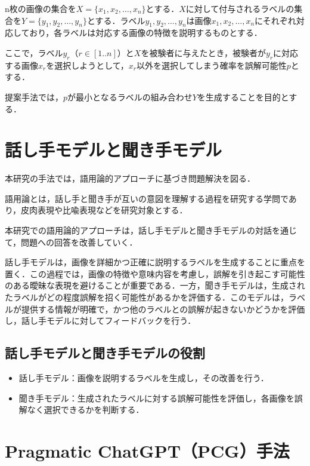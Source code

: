 \documentclass[a4paper,11pt]{jreport}
\begin{document}
n枚の画像の集合を\(X = \{x_1, x_2, \ldots, x_n\}\)とする．\(X\)に対して付与されるラベルの集合を\(Y = \{y_1, y_2, \ldots, y_n\}\)とする．ラベル\(y_1, y_2, \ldots, y_n\)は画像\(x_1, x_2, \ldots, x_n\)にそれぞれ対応しており，各ラベルは対応する画像の特徴を説明するものとする．

ここで，ラベル\(y_r\)（$r \in [1..n]$）と\(X\)を被験者に与えたとき，被験者が\(y_r\)に対応する画像\(x_r\)を選択しようとして，\(x_r\)以外を選択してしまう確率を誤解可能性\(p\)とする．

提案手法では，\(p\)が最小となるラベルの組み合わせ\(Y\)を生成することを目的とする．


\section{話し手モデルと聞き手モデル}

本研究の手法では，語用論的アプローチに基づき問題解決を図る．

語用論とは，話し手と聞き手が互いの意図を理解する過程を研究する学問であり，皮肉表現や比喩表現などを研究対象とする．

本研究での語用論的アプローチは，話し手モデルと聞き手モデルの対話を通じて，問題への回答を改善していく．

話し手モデルは，画像を詳細かつ正確に説明するラベルを生成することに重点を置く．この過程では，画像の特徴や意味内容を考慮し，誤解を引き起こす可能性のある曖昧な表現を避けることが重要である．一方，聞き手モデルは，生成されたラベルがどの程度誤解を招く可能性があるかを評価する．このモデルは，ラベルが提供する情報が明確で，かつ他のラベルとの誤解が起きないかどうかを評価し，話し手モデルに対してフィードバックを行う．
\subsection{話し手モデルと聞き手モデルの役割}

\begin{itemize}
  \item 話し手モデル：画像を説明するラベルを生成し，その改善を行う．
  \item 聞き手モデル：生成されたラベルに対する誤解可能性を評価し，各画像を誤解なく選択できるかを判断する．
\end{itemize}


\section{Pragmatic ChatGPT（PCG）手法}
\end{document}
